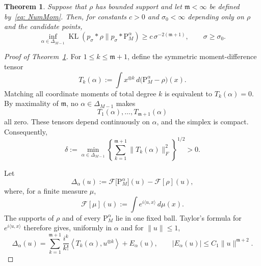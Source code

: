 \documentclass[10pt,a4paper]{amsart}
\newtheorem{thm}{Theorem}
\begin{document}
\begin{thm}
\label{thm: LowBd}
Suppose that $\rho$ has bounded support and let $\mathfrak m<\infty$ be
defined by~\eqref{eq: NumMom}. Then, for constants $c>0$ and
$\sigma_0<\infty$ depending only on $\rho$ and the candidate points,
\begin{equation}
\label{eq:uniform-kl-lower-bound}
\inf_{\alpha\in\Delta_{M-1}}
\operatorname{KL}(p_\sigma*\rho\|p_\sigma*\mathrm P_M^\alpha)
\geq
c\,\sigma^{-2(\mathfrak m+1)},
\qquad \sigma\geq\sigma_0.
\end{equation}
\end{thm}

\begin{proof}[Proof of Theorem~\ref{thm: LowBd}]

For \(1\leq k\leq \mathfrak{m}+1\), define the symmetric
moment-difference tensor
\[
  T_k(\alpha)
  :=
  \int x^{\otimes k}\,
  d\bigl(\mathrm{P}_M^\alpha-\rho\bigr)(x).
\]
Matching all coordinate moments of total degree \(k\) is equivalent to
\(T_k(\alpha)=0\). By maximality of \(\mathfrak{m}\), no
\(\alpha\in\Delta_{M-1}\) makes
\[
  T_1(\alpha),\ldots,T_{\mathfrak{m}+1}(\alpha)
\]
all zero. These tensors depend continuously on \(\alpha\), and the
simplex is compact. Consequently,
\begin{equation}
  \delta
  :=
  \min_{\alpha\in\Delta_{M-1}}
  \left\{
    \sum_{k=1}^{\mathfrak{m}+1}
    \|T_k(\alpha)\|_F^2
  \right\}^{1/2}
  >0.
  \label{eq:uniform-moment-gap}
\end{equation}

Let
\[
  \Delta_\alpha(u)
  :=
  \mathcal{F}\bigl[\mathrm{P}_M^\alpha\bigr](u)
  -
  \mathcal{F}[\rho](u),
\]
where, for a finite measure \(\mu\),
\[
  \mathcal{F}[\mu](u)
  :=
  \int e^{i\langle u,x\rangle}\,d\mu(x).
\]
The supports of \(\rho\) and of every \(\mathrm{P}_M^\alpha\) lie in
one fixed ball. Taylor's formula for \(e^{i\langle u,x\rangle}\)
therefore gives, uniformly in \(\alpha\) and for \(\|u\|\leq 1\),
\begin{equation}
  \Delta_\alpha(u)
  =
  \sum_{k=1}^{\mathfrak{m}+1}
  \frac{i^k}{k!}
  \left\langle T_k(\alpha),u^{\otimes k}\right\rangle
  +
  E_\alpha(u),
  \qquad
  |E_\alpha(u)|
  \leq
  C_1\|u\|^{\mathfrak{m}+2}.
  \label{eq:uniform-characteristic-expansion}
\end{equation}


\end{proof}
\end{document}

